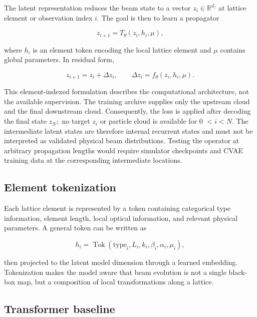 The latent representation reduces the beam state to a vector \(z_{i} \in \mathbb{R}^{d_{z}}\) at lattice element or observation index \(i .\) The goal is then to learn a propagator

\begin{equation}
\label{eq:150}
z_{i+1}=T_{\theta}(z_i,h_i,\mu),
\end{equation}

where \(h_{i}\) is an element token encoding the local lattice element and \(\mu\) contains global parameters. In residual form,

\begin{equation}
\label{eq:151}
z_{i+1}=z_i+\Delta z_i,\qquad\Delta z_i=f_{\theta}(z_i,h_i,\mu).
\end{equation}

This element-indexed formulation describes the computational architecture, not the available supervision. The training archive supplies only the upstream cloud and the final downstream cloud. Consequently, the loss is applied after decoding the final state \(z_{N} ;\) no target \(z_{i}\) or particle cloud is available for 0 \(< i < N .\) The intermediate latent states are therefore internal recurrent states and must not be interpreted as validated physical beam distributions. Testing the operator at arbitrary propagation lengths would require simulator checkpoints and CVAE training data at the corresponding intermediate locations.

\subsection{Element tokenization}
\label{sec:04_machine_learning_methodology_element_tokenization}

Each lattice element is represented by a token containing categorical type information, element length, local optical information, and relevant physical parameters. A general token can be written as

\begin{equation}
\label{eq:152}
h_i=\operatorname{Tok}(\mathrm{type}_i,L_i,k_i,\beta_i,\alpha_i,\mu_i),
\end{equation}

then projected to the latent model dimension through a learned embedding. Tokenization makes the model aware that beam evolution is not a single black-box map, but a composition of local transformations along a lattice.

\subsection{Transformer baseline}
\label{sec:04_machine_learning_methodology_transformer_baseline}

